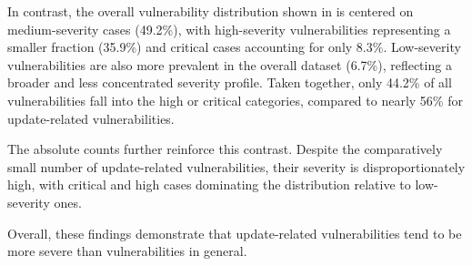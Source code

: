 \documentclass[fleqn,s1,names,tex]{neptune}
\begin{document}
In contrast, the overall vulnerability distribution shown in   is centered on medium-severity cases (49.2\%), with high-severity vulnerabilities representing a smaller fraction (35.9\%) and critical cases accounting for only 8.3\%. 
Low-severity vulnerabilities are also more prevalent in the overall dataset (6.7\%), reflecting a broader and less concentrated severity profile. 
Taken together, only 44.2\% of all vulnerabilities fall into the high or critical categories, compared to nearly 56\% for update-related vulnerabilities.

The absolute counts further reinforce this contrast. Despite the comparatively small number of update-related vulnerabilities, their severity is disproportionately high, with critical and high cases dominating the distribution relative to low-severity ones. 


Overall, these findings demonstrate that update-related vulnerabilities tend to be more severe than vulnerabilities in general.
\end{document}
